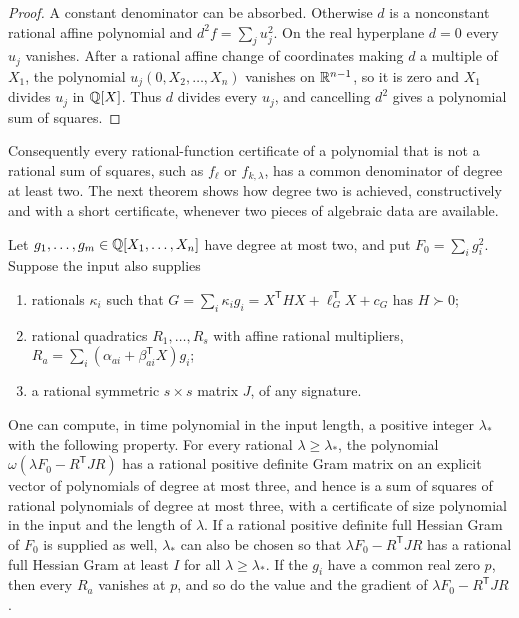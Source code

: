 \begin{proof}
A constant denominator can be absorbed. Otherwise $d$ is a nonconstant
rational affine polynomial and $d^2f=\sum_ju_j^2$. On the real hyperplane
$d=0$ every $u_j$ vanishes. After a rational affine change of coordinates
making $d$ a multiple of $X_1$, the polynomial $u_j(0,X_2,\ldots,X_n)$
vanishes on $\mathbb R^{n-1}$, so it is zero and $X_1$ divides $u_j$ in $\mathbb Q[X]$.
Thus $d$ divides every $u_j$, and cancelling $d^2$ gives a polynomial sum of
squares.
\end{proof}

Consequently every rational-function certificate of a polynomial that is not a
rational sum of squares, such as $f_\ell$ or $f_{k,\lambda}$, has a common
denominator of degree at least two. The next theorem shows how degree two is
achieved, constructively and with a short certificate, whenever two pieces
of algebraic data are available.

\begin{theorem}
\label{thm:fields-multiplier}
Let $g_1,\ldots,g_m\in\mathbb Q[X_1,\ldots,X_n]$ have degree at most two, and put
$F_0=\sum_ig_i^2$. Suppose the input also supplies
\begin{enumerate}[label=(\roman*)]
\item rationals $\kappa_i$ such that
  $G=\sum_i\kappa_ig_i=X^{\mathsf T}HX+\ell_G^{\mathsf T}X+c_G$ has $H\succ0$;
\item rational quadratics $R_1,\ldots,R_s$ with affine rational multipliers,
  $R_a=\sum_i(\alpha_{ai}+\beta_{ai}^{\mathsf T}X)g_i$;
\item a rational symmetric $s\times s$ matrix $J$, of any signature.
\end{enumerate}
One can compute, in time polynomial in the input length, a positive integer
$\lambda_*$ with the following property. For every rational
$\lambda\ge\lambda_*$, the polynomial $\omega(\lambda F_0-R^{\mathsf T}JR)$
has a rational positive definite Gram matrix on an explicit vector of
polynomials of degree at most three, and hence is a sum of squares of
rational polynomials of degree at most three, with a certificate of size
polynomial in the input and the length of $\lambda$. If a rational positive
definite full Hessian Gram of $F_0$ is supplied as well, $\lambda_*$ can also
be chosen so that $\lambda F_0-R^{\mathsf T}JR$ has a rational full Hessian
Gram at least $I$ for all $\lambda\ge\lambda_*$. If the $g_i$ have a common
real zero $p$, then every $R_a$ vanishes at $p$, and so do the value and the
gradient of $\lambda F_0-R^{\mathsf T}JR$.
\end{theorem}

